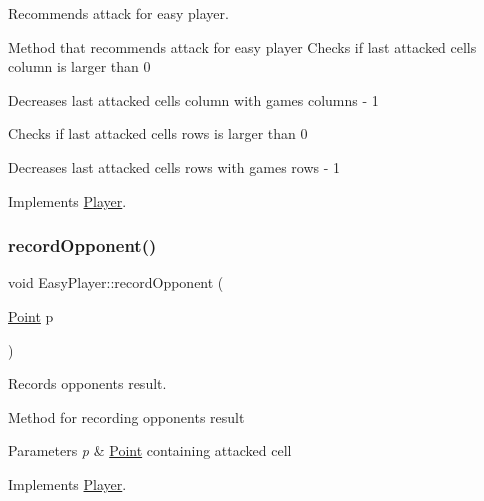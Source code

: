 Recommends attack for easy player. 

Method that recommends attack for easy player Checks if last attacked cell\textquotesingle{}s column is larger than 0

Decreases last attacked cell\textquotesingle{}s column with game\textquotesingle{}s columns -\/ 1

Checks if last attacked cell\textquotesingle{}s rows is larger than 0

Decreases last attacked cell\textquotesingle{}s rows with game\textquotesingle{}s rows -\/ 1 

Implements \mbox{\hyperlink{class_player_a2cc7a83d11158eafd8d49d4b9f23ce56}{Player}}.

\mbox{\label{class_easy_player_a2121149ace67b4a67a5dfa7633738ea3}} 
\subsubsection{\texorpdfstring{record\+Opponent()}{recordOpponent()}}
{\footnotesize\ttfamily void Easy\+Player\+::record\+Opponent (\begin{DoxyParamCaption}\item[{\mbox{\hyperlink{class_point}{Point}}}]{p }\end{DoxyParamCaption})\hspace{0.3cm}{\ttfamily [virtual]}}



Records opponent\textquotesingle{}s result. 

Method for recording opponent\textquotesingle{}s result 
\begin{DoxyParams}{Parameters}
{\em p} & \mbox{\hyperlink{class_point}{Point}} containing attacked cell \\
\hline
\end{DoxyParams}


Implements \mbox{\hyperlink{class_player_a768e14edee61e208e6fd295cdd72a49c}{Player}}.

\mbox{\label{class_easy_player_a254a5ddcd421e1dc71e45125e7ab04d8}} 
